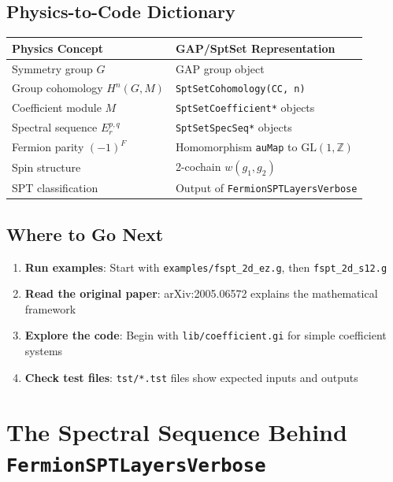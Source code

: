 \documentclass{SciPost}
\begin{document}
\subsection{Physics-to-Code Dictionary}

\begin{center}
\begin{tabular}{|l|l|}
\hline
\textbf{Physics Concept} & \textbf{GAP/SptSet Representation} \\
\hline
Symmetry group $G$ & GAP group object \\
\hline
Group cohomology $H^n(G, M)$ & \texttt{SptSetCohomology(CC, n)} \\
\hline
Coefficient module $M$ & \texttt{SptSetCoefficient*} objects \\
\hline
Spectral sequence $E_r^{p,q}$ & \texttt{SptSetSpecSeq*} objects \\
\hline
Fermion parity $(-1)^F$ & Homomorphism \texttt{auMap} to $\text{GL}(1,\mathbb{Z})$ \\
\hline
Spin structure & 2-cochain $w(g_1, g_2)$ \\
\hline
SPT classification & Output of \texttt{FermionSPTLayersVerbose} \\
\hline
\end{tabular}
\end{center}

\subsection{Where to Go Next}

\begin{enumerate}
    \item \textbf{Run examples}: Start with \texttt{examples/fspt\_2d\_ez.g}, then \texttt{fspt\_2d\_s12.g}
    \item \textbf{Read the original paper}: arXiv:2005.06572 explains the mathematical framework
    \item \textbf{Explore the code}: Begin with \texttt{lib/coefficient.gi} for simple coefficient systems
    \item \textbf{Check test files}: \texttt{tst/*.tst} files show expected inputs and outputs
\end{enumerate}

\section{The Spectral Sequence Behind \texttt{FermionSPTLayersVerbose}}
\label{sec:layers-pedagogical}
\end{document}
